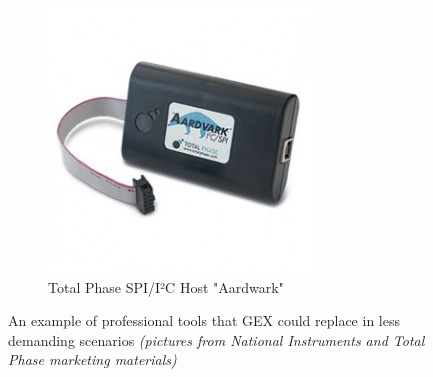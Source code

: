 \begin{figure}[h]
\begin{subfigure}{.5\textwidth}
		\includegraphics[width=.95\linewidth]{img/total-phase-spi-i2c.jpg}
		\caption{Total Phase SPI/I²C Host "Aardwark"}
	\end{subfigure}
	\caption[Professional tools that GEX can replace]{\label{fig:profidaq}An example of professional tools that GEX could replace in less demanding scenarios \textit{(pictures from National Instruments and Total Phase marketing materials)}}
\end{figure}

